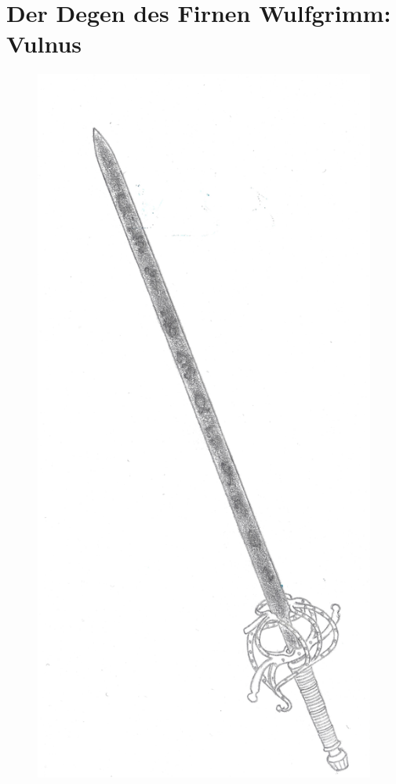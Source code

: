 \section{Der Degen des Firnen Wulfgrimm: Vulnus}
\begin{figure}[b]
    \centering
    \begin{minipage}{0.3\linewidth}
    \centering
    \includegraphics[width=\textwidth]{illustrations/firnen_endurium.jpg}

\end{minipage}
\end{figure}

